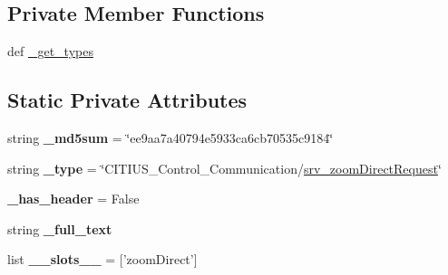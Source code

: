 \subsection*{\-Private \-Member \-Functions}
\begin{DoxyCompactItemize}
\item 
def \hyperlink{class_c_i_t_i_u_s___control___communication_1_1srv_1_1__srv__zoom_direct_1_1srv__zoom_direct_request_aedb2679b8cf9d9be4a99e0827298efaf}{\-\_\-get\-\_\-types}
\end{DoxyCompactItemize}
\subsection*{\-Static \-Private \-Attributes}
\begin{DoxyCompactItemize}
\item 
\hypertarget{class_c_i_t_i_u_s___control___communication_1_1srv_1_1__srv__zoom_direct_1_1srv__zoom_direct_request_a7d61fab3b3e9ff13347b8970a6bfc215}{string {\bfseries \-\_\-md5sum} = \char`\"{}ee9aa7a40794e5933ca6cb70535c9184\char`\"{}}\label{class_c_i_t_i_u_s___control___communication_1_1srv_1_1__srv__zoom_direct_1_1srv__zoom_direct_request_a7d61fab3b3e9ff13347b8970a6bfc215}

\item 
\hypertarget{class_c_i_t_i_u_s___control___communication_1_1srv_1_1__srv__zoom_direct_1_1srv__zoom_direct_request_a6a698d291c042c7ab6fd7b170376f245}{string {\bfseries \-\_\-type} = \char`\"{}\-C\-I\-T\-I\-U\-S\-\_\-\-Control\-\_\-\-Communication/\hyperlink{class_c_i_t_i_u_s___control___communication_1_1srv_1_1__srv__zoom_direct_1_1srv__zoom_direct_request}{srv\-\_\-zoom\-Direct\-Request}\char`\"{}}\label{class_c_i_t_i_u_s___control___communication_1_1srv_1_1__srv__zoom_direct_1_1srv__zoom_direct_request_a6a698d291c042c7ab6fd7b170376f245}

\item 
\hypertarget{class_c_i_t_i_u_s___control___communication_1_1srv_1_1__srv__zoom_direct_1_1srv__zoom_direct_request_aac7653a38c7a688b78638aef5c628466}{{\bfseries \-\_\-has\-\_\-header} = \-False}\label{class_c_i_t_i_u_s___control___communication_1_1srv_1_1__srv__zoom_direct_1_1srv__zoom_direct_request_aac7653a38c7a688b78638aef5c628466}

\item 
string {\bfseries \-\_\-full\-\_\-text}
\item 
\hypertarget{class_c_i_t_i_u_s___control___communication_1_1srv_1_1__srv__zoom_direct_1_1srv__zoom_direct_request_a2d36e5cbc39f66caf51d9dc3564f04be}{list {\bfseries \-\_\-\-\_\-slots\-\_\-\-\_\-} = \mbox{[}'zoom\-Direct'\mbox{]}}\label{class_c_i_t_i_u_s___control___communication_1_1srv_1_1__srv__zoom_direct_1_1srv__zoom_direct_request_a2d36e5cbc39f66caf51d9dc3564f04be}


\end{DoxyCompactItemize}
